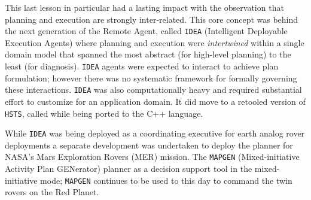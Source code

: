This last lesson in particular had a lasting impact with the
observation that planning and execution are strongly
inter-related. This core concept was behind the next generation of the
Remote Agent, called \texttt{IDEA} (Intelligent Deployable Execution
Agents) where planning and execution were \emph{intertwined} within a
single domain model that spanned the most abstract (for high-level
planning) to the least (for diagnosis). \texttt{IDEA} \cite{mus02,
  mus04} agents were expected to interact to achieve plan formulation;
however there was no systematic framework for formally governing these
interactions. \texttt{IDEA} was also computationally heavy and
required substantial effort to customize for an application domain. It
did move to a retooled version of \texttt{HSTS}, called \eu
\cite{frank2003, barreiro09} while being ported to the C++ language.

While \texttt{IDEA} was being deployed as a coordinating executive for
earth analog rover deployments \cite{wetter05} a separate development
was undertaken to deploy the \eu planner for NASA’s Mars Exploration
Rovers (MER) mission. The \texttt{MAPGEN} (Mixed-initiative Activity
Plan GENerator) planner \cite{bresina03, aichang04, bresina05,
  bresina05a} as a decision support tool in the mixed-initiative mode;
\texttt{MAPGEN} continues to be used to this day to command the twin
rovers on the Red Planet. %

